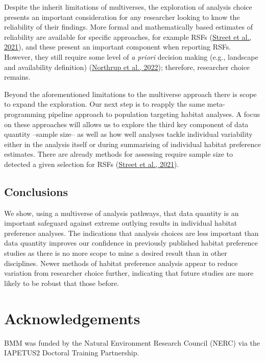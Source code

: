 \documentclass[10pt,a4paper]{article}
\begin{document}
Despite the inherit limitations of multiverses, the exploration of analysis choice presents an important consideration for any researcher looking to know the reliability of their findings.
More formal and mathematically based estimates of reliability are available for specific approaches, for example RSFs (\protect\hyperlink{ref-street_solving_2021}{Street et al., 2021}), and these present an important component when reporting RSFs.
However, they still require some level of \emph{a priori} decision making (e.g., landscape and availability definition) (\protect\hyperlink{ref-northrup_conceptual_2022}{Northrup et al., 2022}); therefore, researcher choice remains.

Beyond the aforementioned limitations to the multiverse approach there is scope to expand the exploration.
Our next step is to reapply the same meta-programming pipeline approach to population targeting habitat analyses.
A focus on these approaches will allows us to explore the third key component of data quantity --sample size-- as well as how well analyses tackle individual variability either in the analysis itself or during summarising of individual habitat preference estimates.
There are already methods for assessing require sample size to detected a given selection for RSFs (\protect\hyperlink{ref-street_solving_2021}{Street et al., 2021}).

\hypertarget{conclusions}{%
\subsection{Conclusions}\label{conclusions}}

We show, using a multiverse of analysis pathways, that data quantity is an important safeguard against extreme outlying results in individual habitat preference analyses.
The indications that analysis choices are less important than data quantity improves our confidence in previously published habitat preference studies as there is no more scope to mine a desired result than in other disciplines.
Newer methods of habitat preference analysis appear to reduce variation from researcher choice further, indicating that future studies are more likely to be robust that those before.

\hypertarget{acknowledgements}{%
\section{Acknowledgements}\label{acknowledgements}}

BMM was funded by the Natural Environment Research Council (NERC) via the IAPETUS2 Doctoral Training Partnership.
\end{document}
